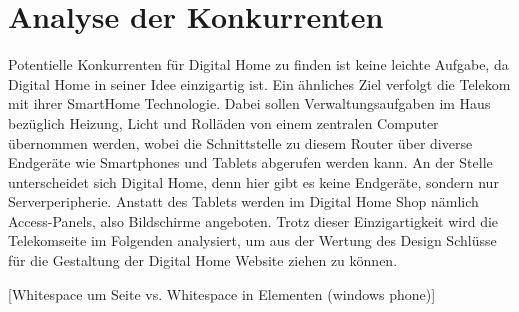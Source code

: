 \section{Analyse der Konkurrenten}
Potentielle Konkurrenten für Digital Home zu finden ist keine leichte Aufgabe, da Digital Home in seiner Idee einzigartig ist. Ein ähnliches Ziel verfolgt die Telekom mit ihrer SmartHome Technologie. Dabei sollen Verwaltungsaufgaben im Haus bezüglich Heizung, Licht und Rolläden von einem zentralen Computer übernommen werden, wobei die Schnittstelle zu diesem Router über diverse Endgeräte wie Smartphones und Tablets abgerufen werden kann. An der Stelle unterscheidet sich Digital Home, denn hier gibt es keine Endgeräte, sondern nur Serverperipherie. Anstatt des Tablets werden im Digital Home Shop nämlich Access-Panels, also Bildschirme angeboten. Trotz dieser Einzigartigkeit wird die Telekomseite im Folgenden analysiert, um aus der Wertung des Design Schlüsse für die Gestaltung der Digital Home Website ziehen zu können.

[Whitespace um Seite vs. Whitespace in Elementen (windows phone)]
